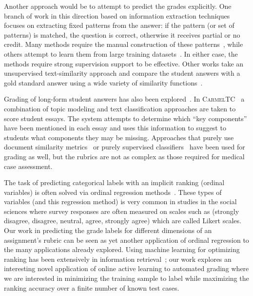 Another approach would be to attempt to predict the grades explicitly. One
branch of work in this direction based on information extraction techniques
focuses on extracting fixed patterns from the answer: if the pattern (or
set of patterns) is matched, the question is correct, otherwise it receives
partial or no credit. Many methods require the manual construction of these
patterns~\cite{Mitchell:2002:ICAA, Leacock:2003:CatH}, while others attempt to
learn them from large training datasets~\cite{Pulman:2005:EdAppsNLP}. In either
case, the methods require strong supervision support to be effective.  Other
works take an unsupervised text-similarity approach and compare the student
answers with a gold standard answer using a wide variety of similarity
functions~\cite{Mohler:2009:EACL}.

Grading of long-form student answers has also been
explored~\cite{Balfour:2013}. In
\textsc{CarmelTC}~\cite{Rose:2003:HLT-NAACL-EDUC} a combination of topic
modeling and text classification approaches are taken to score student
essays. The system attempts to determine which ``key components'' have been
mentioned in each essay and uses this information to suggest to students
what components they may be missing. Approaches that purely use document
similarity metrics~\cite{Duwairi:2006:CHB} or purely supervised
classifiers~\cite{Larkey:1998:SIGIR} have been used for grading as well,
but the rubrics are not as complex as those required for medical case
assessment.

The task of predicting categorical labels with an implicit ranking (ordinal
variables) is often solved via ordinal regression
methods~\cite{McCullagh:1980}. These types of variables (and this
regression method) is very common in studies in the social sciences where
survey responses are often measured on scales such as (strongly disagree,
disagree, neutral, agree, strongly agree) which are called Likert
scales. Our work in predicting the grade labels for different dimensions of
an assignment's rubric can be seen as yet another application of ordinal
regression to the many applications already explored. Using machine
learning for optimizing ranking has been extensively in information
retrieval~\cite{Liu:2009}; our work explores an interesting novel
application of online active learning to automated grading where we are
interested in minimizing the training sample to label while maximizing the
ranking accuracy over a finite number of known test cases.  
